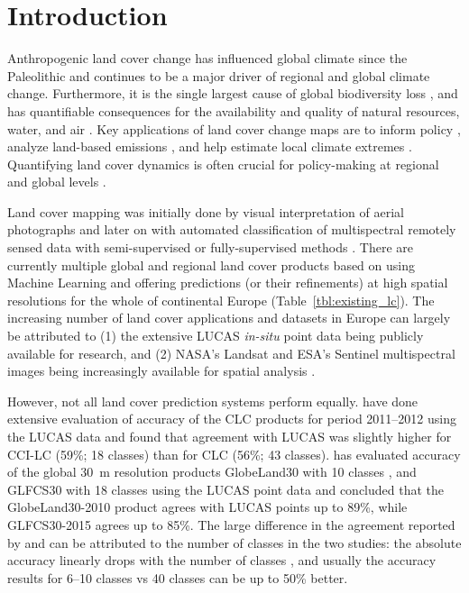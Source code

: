\newpage

\section{Introduction}

Anthropogenic land cover change has influenced global climate since the Paleolithic \citep{kaplan2011holocene} and continues to be a major driver of regional \citep{pielke2002influence} and global \citep{houghton2012carbon} climate change. Furthermore, it is the single largest cause of global biodiversity loss \citep{sala2000global}, and has quantifiable consequences for the availability and quality of natural resources, water, and air \citep{foley2005global}. Key applications of land cover change maps are to inform policy \citep{duveiller2020}, analyze land-based emissions \citep{hong2021luemissions}, and help estimate local climate extremes \citep{sy2020}. Quantifying land cover dynamics is often crucial for policy-making at regional and global levels \citep{liu2020assessing,trisurat2019land,shumba2020effectiveness}.
    
Land cover mapping was initially done by visual interpretation of aerial photographs and later on with automated classification of multispectral remotely sensed data with semi-supervised or fully-supervised methods \citep{townshend2012global, feranec2016european, liu2021finer}. There are currently multiple global \citep{feng2019global,buchhorn2020copernicus} and regional \citep{homer2007completion,batista2013procedure,pflugmacher2019mapping,malinowski2020,dandrimont2021lucas} land cover products based on using Machine Learning and offering predictions (or their refinements) at high spatial resolutions for the whole of continental Europe (Table\@~\ref{tbl:existing_lc}). The increasing number of land cover applications and datasets in Europe can largely be attributed to (1) the extensive LUCAS \emph{in-situ} point data being publicly available for research, and (2) NASA's Landsat and ESA's Sentinel multispectral images being increasingly available for spatial analysis \citep{szantoi2020addressing,liu2021finer}.
    
However, not all land cover prediction systems perform equally. \citet{vilar2019comparative} have done extensive evaluation of accuracy of the CLC products for period 2011--2012 using the LUCAS data and found that agreement with LUCAS was slightly higher for CCI-LC (59\%; 18 classes) than for CLC (56\%; 43 classes). \citet{gao2020consistency} has evaluated accuracy of the global 30~m resolution products GlobeLand30 with 10 classes \citep{chen2015global}, and GLFCS30 with 18 classes \citep{zhang2020glc_fcs30} using the LUCAS point data and concluded that the GlobeLand30-2010 product agrees with LUCAS points up to 89\%, while GLFCS30-2015 agrees up to 85\%. The large difference in the agreement reported by \citet{vilar2019comparative} and \citet{chen2015global} can be attributed to the number of classes in the two studies: the absolute accuracy linearly drops with the number of classes \citep{herold2008some,van2019does}, and usually the accuracy results for 6--10 classes vs 40 classes can be up to 50\% better. 
    
